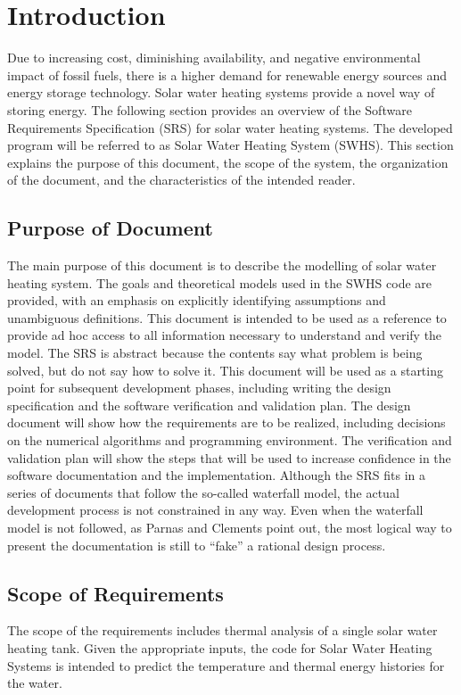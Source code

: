 \documentclass[12pt]{article}
\begin{document}
\section{Introduction}
\label{Sec:Intro}
Due to increasing cost, diminishing availability, and negative environmental impact of fossil fuels, there is a higher demand for renewable energy sources and energy storage technology. Solar water heating systems provide a novel way of storing energy.
The following section provides an overview of the Software Requirements Specification (SRS) for solar water heating systems. The developed program will be referred to as Solar Water Heating System (SWHS). This section explains the purpose of this document, the scope of the system, the organization of the document, and the characteristics of the intended reader.
\subsection{Purpose of Document}
\label{Sec:DocPurpose}
The main purpose of this document is to describe the modelling of solar water heating system. The goals and theoretical models used in the SWHS code are provided, with an emphasis on explicitly identifying assumptions and unambiguous definitions. This document is intended to be used as a reference to provide ad hoc access to all information necessary to understand and verify the model. The SRS is abstract because the contents say what problem is being solved, but do not say how to solve it.
This document will be used as a starting point for subsequent development phases, including writing the design specification and the software verification and validation plan. The design document will show how the requirements are to be realized, including decisions on the numerical algorithms and programming environment. The verification and validation plan will show the steps that will be used to increase confidence in the software documentation and the implementation. Although the SRS fits in a series of documents that follow the so-called waterfall model, the actual development process is not constrained in any way. Even when the waterfall model is not followed, as Parnas and Clements point out, the most logical way to present the documentation is still to ``fake'' a rational design process.
\subsection{Scope of Requirements}
\label{Sec:ReqsScope}
The scope of the requirements includes thermal analysis of a single solar water heating tank. Given the appropriate inputs, the code for Solar Water Heating Systems is intended to predict the temperature and thermal energy histories for the water.
\end{document}
